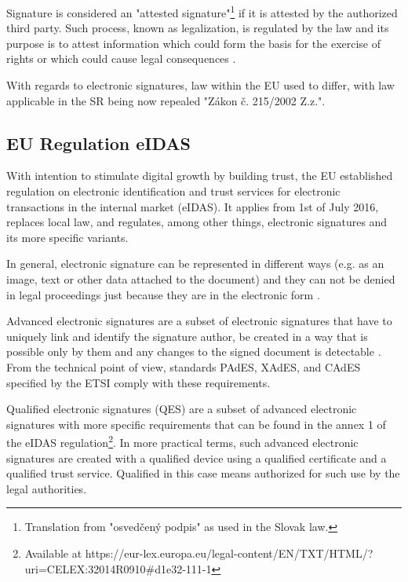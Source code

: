 \documentclass[thesismargins, english, thesislinespacing, twoside, openright, upjsfrontpage]{rnthesis}
\begin{document}
Signature is considered an "attested signature"\footnote{Translation from "osvedčený podpis" as used in the Slovak law.} if it is attested by the authorized third party.
Such process, known as legalization, is regulated by the law and its purpose is to attest information which could form the basis for the exercise of rights or which could cause legal consequences \cite{3}.

With regards to electronic signatures, law within the EU used to differ, with law applicable in the SR being now repealed "Zákon č. 215/2002 Z.z.".

\subsection{EU Regulation eIDAS}

With intention to stimulate digital growth by building trust, the EU established regulation on electronic identification and trust services for electronic transactions in the internal market (eIDAS).
It applies from 1st of July 2016, replaces local law, and regulates, among other things, electronic signatures and its more specific variants.


In general, electronic signature can be represented in different ways (e.g. as an image, text or other data attached to the document) and they can not be denied in legal proceedings just because they are in the electronic form \cite{4}.

Advanced electronic signatures are a subset of electronic signatures that have to uniquely link and identify the signature author, be created in a way that is possible only by them and any changes to the signed document is detectable \cite{5}.
From the technical point of view, standards PAdES, XAdES, and CAdES specified by the ETSI comply with these requirements.

Qualified electronic signatures (QES) are a subset of advanced electronic signatures with more specific requirements that can be found in the annex 1 of the eIDAS regulation\footnote{Available at https://eur-lex.europa.eu/legal-content/EN/TXT/HTML/?uri=CELEX:32014R0910\#d1e32-111-1}.
In more practical terms, such advanced electronic signatures are created with a qualified device using a qualified certificate and a qualified trust service. Qualified in this case means authorized for such use by the legal authorities.
\end{document}
